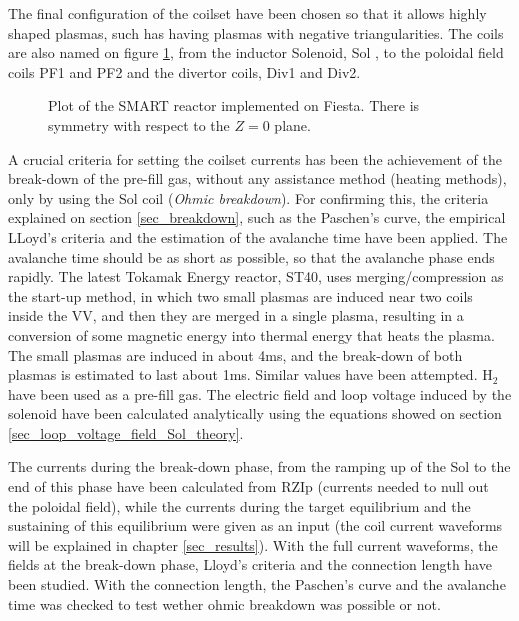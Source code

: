\documentclass[a4paper,12pt,oneside]{book}
\begin{document}
The final configuration of the coilset have been chosen so that it allows highly shaped plasmas, such has having plasmas with negative triangularities. The coils are also named on figure \ref{fig_SMART_3D_2D}, from the inductor Solenoid, Sol , to the poloidal field coils PF1 and PF2 and the divertor coils, Div1 and Div2.


\begin{figure}[htbp]
\centering
{}
\hfill
{}
\caption{Plot of the SMART reactor implemented on Fiesta. There is symmetry with respect to the $Z=0$ plane.}
\label{fig_SMART_3D_2D}
\end{figure}

A crucial criteria for setting the coilset currents has been the achievement of the break-down of the pre-fill gas, without any assistance method (heating methods), only by using the Sol coil (\textit{Ohmic breakdown}). For confirming this, the criteria explained on section \ref{sec_breakdown}, such as the Paschen's curve, the empirical LLoyd's criteria and the estimation of the avalanche time have been applied. The avalanche time should be as short as possible, so that the avalanche phase ends rapidly. The latest Tokamak Energy reactor, ST40, \cite{Buxton_results, Gryaznevich_2017} uses merging/compression as the start-up method, in which two small plasmas are induced near two coils inside the VV, and then they are merged in a single plasma, resulting in a conversion of some magnetic energy into thermal energy that heats the plasma. The small plasmas are induced in about 4ms, and the break-down of both plasmas is estimated to last about 1ms. Similar values have been attempted. H$_2$ have been used as a pre-fill gas. The electric field and loop voltage induced by the solenoid have been calculated analytically using the equations showed on section \ref{sec_loop_voltage_field_Sol_theory}.

The currents during the break-down phase, from the ramping up of the Sol to the end of this phase have been calculated from RZIp (currents needed to null out the poloidal field), while the currents during the target equilibrium and the sustaining of this equilibrium were given as an input (the coil current waveforms will be explained in chapter \ref{sec_results}). With the full current waveforms, the fields at the break-down phase, Lloyd's criteria and the connection length have been studied. With the connection length, the Paschen's curve and the avalanche time was checked to test wether ohmic breakdown was possible or not.
\end{document}
